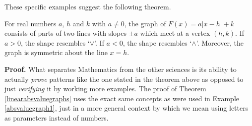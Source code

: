 These specific examples suggest the following theorem.

\bigskip

\colorbox{ResultColor}{\bbm

\begin{thm} \label{linearabsvaluegraphs}  For real numbers $a$, $h$ and $k$ with $a \neq 0$, the graph of $F(x) = a|x - h| + k$ consists of parts of two lines  with slopes $\pm a$ which meet at a vertex $(h, k)$.  If $a > 0$, the shape resembles `$\vee$'.  If $a<0$, the shape resembles `$\wedge$'.  Moreover, the graph is symmetric about the line $x = h$.

\end{thm}

\ebm}

\bigskip

{\bf Proof.} What separates Mathematics from the other sciences is its ability to actually \textit{prove} patterns like the one stated in the theorem above as opposed to just \textit{verifying} it by working more examples.  The proof of Theorem \ref{linearabsvaluegraphs} uses the exact same concepts as were used in Example \ref{absvaluegraph1}, just in a more general context by which we mean using letters as parameters instead of numbers.  

\medskip

